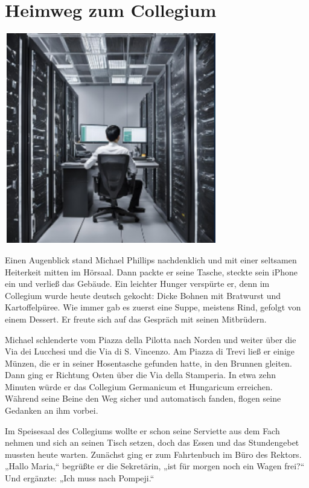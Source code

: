 \documentclass[
]{article}
\begin{document}
\section{Heimweg zum Collegium}\label{heimweg-zum-collegium}

\includegraphics[width=3.6596in,height=3.61705in]{media/image14.png}

Einen Augenblick stand Michael Phillips nachdenklich und mit einer
seltsamen Heiterkeit mitten im Hörsaal. Dann packte er seine Tasche,
steckte sein iPhone ein und verließ das Gebäude. Ein leichter Hunger
verspürte er, denn im Collegium wurde heute deutsch gekocht: Dicke
Bohnen mit Bratwurst und Kartoffelpüree. Wie immer gab es zuerst eine
Suppe, meistens Rind, gefolgt von einem Dessert. Er freute sich auf das
Gespräch mit seinen Mitbrüdern.

Michael schlenderte vom Piazza della Pilotta nach Norden und weiter über
die Via dei Lucchesi und die Via di S. Vincenzo. Am Piazza di Trevi ließ
er einige Münzen, die er in seiner Hosentasche gefunden hatte, in den
Brunnen gleiten. Dann ging er Richtung Osten über die Via della
Stamperia. In etwa zehn Minuten würde er das Collegium Germanicum et
Hungaricum erreichen. Während seine Beine den Weg sicher und automatisch
fanden, flogen seine Gedanken an ihm vorbei.

Im Speisesaal des Collegiums wollte er schon seine Serviette aus dem
Fach nehmen und sich an seinen Tisch setzen, doch das Essen und das
Stundengebet mussten heute warten. Zunächst ging er zum Fahrtenbuch im
Büro des Rektors. „Hallo Maria,`` begrüßte er die Sekretärin, „ist für
morgen noch ein Wagen frei?{\kern0pt}`` Und ergänzte: „Ich muss nach
Pompeji.``
\end{document}
